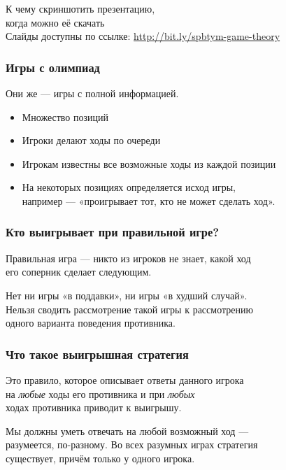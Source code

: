 \begin{frame} \begin{center}
	{\Large К чему скриншотить презентацию,\smallskip\\
		когда можно её скачать} \\ [0.9cm]
	{\small Слайды доступны по ссылке: \url{http://bit.ly/spbtym-game-theory}}
\end{center} \end{frame}

\begin{frame} \frametitle{Игры с олимпиад}
	Они же — игры с полной информацией.

\begin{itemize} \itemsep=2.25mm
	\item Множество позиций
	\item Игроки делают ходы по очереди
	\item Игрокам известны все возможные ходы из каждой позиции
	\item На некоторых позициях определяется исход игры, \\
		например — «проигрывает тот, кто не может сделать ход».
\end{itemize}
\end{frame}

\begin{frame} \frametitle{Кто выигрывает при правильной игре?}
	Правильная игра — никто из игроков не знает, какой ход \\
	его соперник сделает следующим. \bigskip
	
	Нет ни игры «в поддавки», ни игры «в худший случай». \\
	Нельзя сводить рассмотрение такой игры к рассмотрению \\
	одного варианта поведения противника.
\end{frame}

\begin{frame} \frametitle{Что такое выигрышная стратегия}
	Это правило, которое описывает ответы данного игрока \\
	на {\it любые} ходы его противника и при {\it любых} \\
	ходах противника приводит к выигрышу. \bigskip
	
	Мы должны уметь отвечать на любой возможный ход — \\
	разумеется, по-разному. Во всех разумных играх стратегия \\
	существует, причём только у одного игрока.
\end{frame}

